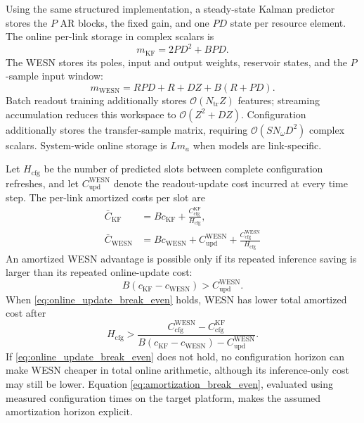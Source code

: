 \documentclass[lettersize,journal]{IEEEtran}
\begin{document}
Using the same structured implementation, a steady-state Kalman predictor
stores the $P$ AR blocks, the fixed gain, and one $PD$ state per resource
element.  The online per-link storage in complex scalars is
\begin{equation}
 m_{\mathrm{KF}}=2PD^2+BPD.
 \label{eq:sskf_memory}
\end{equation}
The WESN stores its poles, input and output weights, reservoir states, and the
$P$-sample input window:
\begin{equation}
 m_{\mathrm{WESN}}
 =RPD+R+DZ+B(R+PD).
 \label{eq:wesn_memory}
\end{equation}
Batch readout training additionally stores $\mathcal{O}(N_{\mathrm{tr}}Z)$
features; streaming accumulation reduces this workspace to
$\mathcal{O}(Z^2+DZ)$.  Configuration additionally stores the transfer-sample
matrix, requiring $\mathcal{O}(SN_{\omega}D^2)$ complex scalars.  System-wide
online storage is $L m_a$ when models are link-specific.

Let $H_{\mathrm{cfg}}$ be the number of predicted slots between complete
configuration refreshes, and let $C_{\mathrm{upd}}^{\mathrm{WESN}}$ denote the
readout-update cost incurred at every time step.  The per-link amortized costs
per slot are
\begin{align}
 \bar C_{\mathrm{KF}}
 &=Bc_{\mathrm{KF}}
 +\frac{C_{\mathrm{cfg}}^{\mathrm{KF}}}{H_{\mathrm{cfg}}},\\
 \bar C_{\mathrm{WESN}}
 &=Bc_{\mathrm{WESN}}
 +C_{\mathrm{upd}}^{\mathrm{WESN}}
 +\frac{C_{\mathrm{cfg}}^{\mathrm{WESN}}}{H_{\mathrm{cfg}}}
 \label{eq:amortized_predictor_cost}
\end{align}
An amortized WESN advantage is possible only if its repeated inference saving
is larger than its repeated online-update cost:
\begin{equation}
 B(c_{\mathrm{KF}}-c_{\mathrm{WESN}})
 > C_{\mathrm{upd}}^{\mathrm{WESN}}.
 \label{eq:online_update_break_even}
\end{equation}
When \eqref{eq:online_update_break_even} holds, WESN has lower total
amortized cost after
\begin{equation}
 H_{\mathrm{cfg}}
 >
 \frac{
 C_{\mathrm{cfg}}^{\mathrm{WESN}}
 -C_{\mathrm{cfg}}^{\mathrm{KF}}
 }{
 B(c_{\mathrm{KF}}-c_{\mathrm{WESN}})
 -C_{\mathrm{upd}}^{\mathrm{WESN}}
 }.
 \label{eq:amortization_break_even}
\end{equation}
If \eqref{eq:online_update_break_even} does not hold, no configuration horizon
can make WESN cheaper in total online arithmetic, although its inference-only
cost may still be lower.
Equation \eqref{eq:amortization_break_even}, evaluated using measured
configuration times on the target platform, makes the assumed amortization
horizon explicit.
\end{document}
